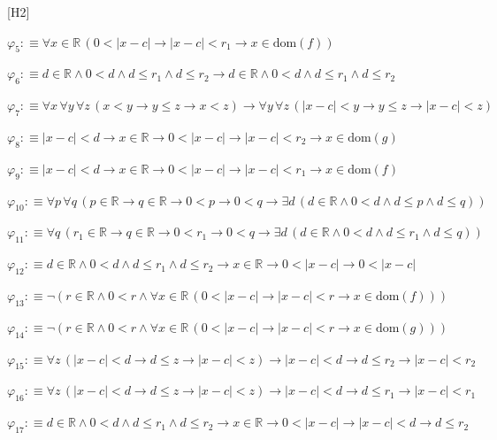 \begin{fullproof}{[H2]}
\begin{abbrevlist}
\item $\varphi_{5} :\equiv \forall x \in \mathbb{R}\,(0 < \lvert x - c \rvert \to \lvert x - c \rvert < r_{1} \to x \in \mathrm{dom}(f))$
\item $\varphi_{6} :\equiv d \in \mathbb{R} \land 0 < d \land d \leq r_{1} \land d \leq r_{2} \to d \in \mathbb{R} \land 0 < d \land d \leq r_{1} \land d \leq r_{2}$
\item $\varphi_{7} :\equiv \forall x\,\forall y\,\forall z\,(x < y \to y \leq z \to x < z) \to \forall y\,\forall z\,(\lvert x - c \rvert < y \to y \leq z \to \lvert x - c \rvert < z)$
\item $\varphi_{8} :\equiv \lvert x - c \rvert < d \to x \in \mathbb{R} \to 0 < \lvert x - c \rvert \to \lvert x - c \rvert < r_{2} \to x \in \mathrm{dom}(g)$
\item $\varphi_{9} :\equiv \lvert x - c \rvert < d \to x \in \mathbb{R} \to 0 < \lvert x - c \rvert \to \lvert x - c \rvert < r_{1} \to x \in \mathrm{dom}(f)$
\item $\varphi_{10} :\equiv \forall p\,\forall q\,(p \in \mathbb{R} \to q \in \mathbb{R} \to 0 < p \to 0 < q \to \exists d\,(d \in \mathbb{R} \land 0 < d \land d \leq p \land d \leq q))$
\item $\varphi_{11} :\equiv \forall q\,(r_{1} \in \mathbb{R} \to q \in \mathbb{R} \to 0 < r_{1} \to 0 < q \to \exists d\,(d \in \mathbb{R} \land 0 < d \land d \leq r_{1} \land d \leq q))$
\item $\varphi_{12} :\equiv d \in \mathbb{R} \land 0 < d \land d \leq r_{1} \land d \leq r_{2} \to x \in \mathbb{R} \to 0 < \lvert x - c \rvert \to 0 < \lvert x - c \rvert$
\item $\varphi_{13} :\equiv \neg (r \in \mathbb{R} \land 0 < r \land \forall x \in \mathbb{R}\,(0 < \lvert x - c \rvert \to \lvert x - c \rvert < r \to x \in \mathrm{dom}(f)))$
\item $\varphi_{14} :\equiv \neg (r \in \mathbb{R} \land 0 < r \land \forall x \in \mathbb{R}\,(0 < \lvert x - c \rvert \to \lvert x - c \rvert < r \to x \in \mathrm{dom}(g)))$
\item $\varphi_{15} :\equiv \forall z\,(\lvert x - c \rvert < d \to d \leq z \to \lvert x - c \rvert < z) \to \lvert x - c \rvert < d \to d \leq r_{2} \to \lvert x - c \rvert < r_{2}$
\item $\varphi_{16} :\equiv \forall z\,(\lvert x - c \rvert < d \to d \leq z \to \lvert x - c \rvert < z) \to \lvert x - c \rvert < d \to d \leq r_{1} \to \lvert x - c \rvert < r_{1}$
\item $\varphi_{17} :\equiv d \in \mathbb{R} \land 0 < d \land d \leq r_{1} \land d \leq r_{2} \to x \in \mathbb{R} \to 0 < \lvert x - c \rvert \to \lvert x - c \rvert < d \to d \leq r_{2}$

\end{abbrevlist}
\end{fullproof}
